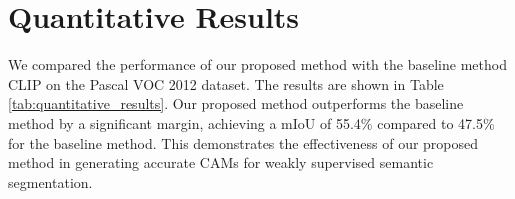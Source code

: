 \section{Quantitative Results}
\label{subsec: Quantitative Results}
We compared the performance of our proposed method with the baseline method CLIP \cite{wsss_frozen_clip} on the Pascal VOC 2012 dataset. The results are shown in Table \ref{tab:quantitative_results}. Our proposed method outperforms the baseline method by a significant margin, achieving a mIoU of 55.4\% compared to 47.5\% for the baseline method. This demonstrates the effectiveness of our proposed method in generating accurate CAMs for weakly supervised semantic segmentation.

